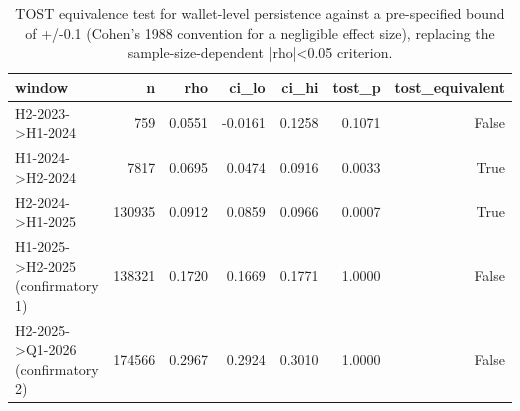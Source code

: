 \begin{table}
\caption{TOST equivalence test for wallet-level persistence against a pre-specified bound of +/-0.1 (Cohen's 1988 convention for a negligible effect size), replacing the sample-size-dependent |rho|<0.05 criterion.}
\label{tab:h1_tost}
\begin{tabular}{lrrrrrr}
\toprule
window & n & rho & ci_lo & ci_hi & tost_p & tost_equivalent \\
\midrule
H2-2023->H1-2024 & 759 & 0.0551 & -0.0161 & 0.1258 & 0.1071 & False \\
H1-2024->H2-2024 & 7817 & 0.0695 & 0.0474 & 0.0916 & 0.0033 & True \\
H2-2024->H1-2025 & 130935 & 0.0912 & 0.0859 & 0.0966 & 0.0007 & True \\
H1-2025->H2-2025 (confirmatory 1) & 138321 & 0.1720 & 0.1669 & 0.1771 & 1.0000 & False \\
H2-2025->Q1-2026 (confirmatory 2) & 174566 & 0.2967 & 0.2924 & 0.3010 & 1.0000 & False \\
\bottomrule
\end{tabular}
\end{table}
